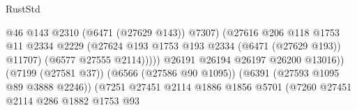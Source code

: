 \begin{lexlean}{RustStd}
\begin{coremodule}
{\begin{coremodule}
{{{{{{{{{{{{{{{{{{{{{{{{{{                                                            @46
                                                            @143
                                                            @2310
                                                            (@6471 (@27629 @143))
                                                            @7307)
                                                          (@27616
                                                            @206
                                                            @118
                                                            @1753
                                                            @11
                                                            @2334
                                                            @2229
                                                            (@27624
                                                              @193
                                                              @1753
                                                              @193
                                                              @2334
                                                              (@6471 (@27629 @193))
                                                              @11707)
                                                            (@6577 @27555 @2114)))))
                                                    @26191
                                                    @26194
                                                    @26197
                                                    @26200
                                                    @13016))
                                                (@7199 (@27581 @37))
                                                (@6566 (@27586 @90 @1095))
                                                (@6391 (@27593 @1095 @89 @3888 @2246))
                                                (@7251
                                                  @27451
                                                  @2114
                                                  @1886
                                                  @1856
                                                  @5701
                                                  (@7260
                                                    @27451
                                                    @2114
                                                    @286
                                                    @1882
                                                    @1753
                                                    @93
}}}}}}}}}}}}}}}}}}}}}}}}}}
\end{coremodule}}
\end{coremodule}
\end{lexlean}
